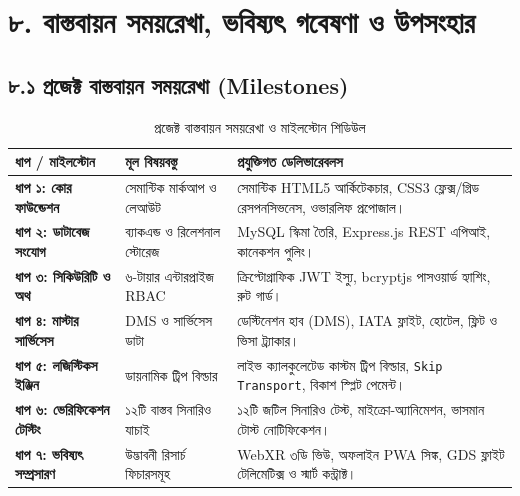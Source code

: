 \documentclass[11pt,a4paper]{article}
\begin{document}
\newpage

\section{৮. বাস্তবায়ন সময়রেখা, ভবিষ্যৎ গবেষণা ও উপসংহার}

\subsection{৮.১ প্রজেক্ট বাস্তবায়ন সময়রেখা (Milestones)}
\begin{table}[H]
\centering
\scriptsize
\begin{tabularx}{\textwidth}{l p{3.8cm} X}
\toprule
\textbf{ধাপ / মাইলস্টোন} & \textbf{মূল বিষয়বস্তু} & \textbf{প্রযুক্তিগত ডেলিভারেবলস} \\
\midrule
\textbf{ধাপ ১: কোর ফাউন্ডেশন} & সেমান্টিক মার্কআপ ও লেআউট & সেমান্টিক HTML5 আর্কিটেকচার, CSS3 ফ্লেক্স/গ্রিড রেসপনসিভনেস, ওভারলিফ প্রপোজাল। \\
\textbf{ধাপ ২: ডাটাবেজ সংযোগ} & ব্যাকএন্ড ও রিলেশনাল স্টোরেজ & MySQL স্কিমা তৈরি, Express.js REST এপিআই, কানেকশন পুলিং। \\
\textbf{ধাপ ৩: সিকিউরিটি ও অথ} & ৬-টায়ার এন্টারপ্রাইজ RBAC & ক্রিপ্টোগ্রাফিক JWT ইস্যু, bcryptjs পাসওয়ার্ড হ্যাশিং, রুট গার্ড। \\
\textbf{ধাপ ৪: মাস্টার সার্ভিসেস} & DMS ও সার্ভিসেস ডাটা & ডেস্টিনেশন হাব (DMS), IATA ফ্লাইট, হোটেল, ফ্লিট ও ভিসা ট্র্যাকার। \\
\textbf{ধাপ ৫: লজিস্টিকস ইঞ্জিন} & ডায়নামিক ট্রিপ বিল্ডার & লাইভ ক্যালকুলেটেড কাস্টম ট্রিপ বিল্ডার, \texttt{Skip Transport}, বিকাশ স্প্লিট পেমেন্ট। \\
\textbf{ধাপ ৬: ভেরিফিকেশন টেস্টিং} & ১২টি বাস্তব সিনারিও যাচাই & ১২টি জটিল সিনারিও টেস্ট, মাইক্রো-অ্যানিমেশন, ভাসমান টোস্ট নোটিফিকেশন। \\
\textbf{ধাপ ৭: ভবিষ্যৎ সম্প্রসারণ} & উদ্ভাবনী রিসার্চ ফিচারসমূহ & WebXR ৩ডি ভিউ, অফলাইন PWA সিঙ্ক, GDS ফ্লাইট টেলিমেটিক্স ও স্মার্ট কন্ট্রাক্ট। \\
\bottomrule
\end{tabularx}
\caption{প্রজেক্ট বাস্তবায়ন সময়রেখা ও মাইলস্টোন শিডিউল}
\end{table}
\end{document}
